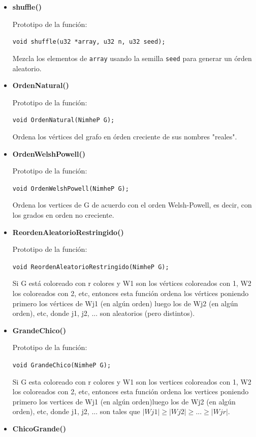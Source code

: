\documentclass[11pt,a4paper]{article}
\theoremstyle{plain}
\begin{document}
\begin{itemize}
\item{\textbf{{shuffle()}}}

Prototipo de la función:

\texttt{void shuffle(u32 *array, u32 n, u32 seed);}

Mezcla los elementos de \texttt{array} usando la semilla \texttt{seed} para generar un órden aleatorio.

\item{\textbf{{OrdenNatural()}}}

Prototipo de la función:

\texttt{void OrdenNatural(NimheP G);}

Ordena los vértices del grafo en órden creciente de sus nombres "reales".

\item{\textbf{{OrdenWelshPowell()}}}

Prototipo de la función:

\texttt{void OrdenWelshPowell(NimheP G);}

Ordena los vertices de G de acuerdo con el orden Welsh-Powell, es decir, con los grados en orden no creciente.

\item{\textbf{{ReordenAleatorioRestringido()}}}

Prototipo de la función:

\texttt{void ReordenAleatorioRestringido(NimheP G);}

Si G está coloreado con r colores y W1 son los vértices coloreados con 1, W2 los coloreados con 2, etc, entonces esta función ordena los vértices poniendo primero los vértices de Wj1 (en algún orden) luego los de Wj2 (en algún orden), etc, donde j1, j2, ... son aleatorios (pero distintos).

\item{\textbf{{GrandeChico()}}}

Prototipo de la función:

\texttt{void GrandeChico(NimheP G);}

Si G esta coloreado con r colores y W1 son los vertices coloreados con 1, W2 los coloreados con 2,
etc, entonces esta función ordena los vertices poniendo primero los vertices de Wj1 (en algún orden)luego los de Wj2 (en algún orden), etc, donde j1, j2, ... son tales que $|Wj1| \geq |Wj2| \geq  ... \geq |Wjr|$.

\item{\textbf{{ChicoGrande()}}}


\end{itemize}
\end{document}
